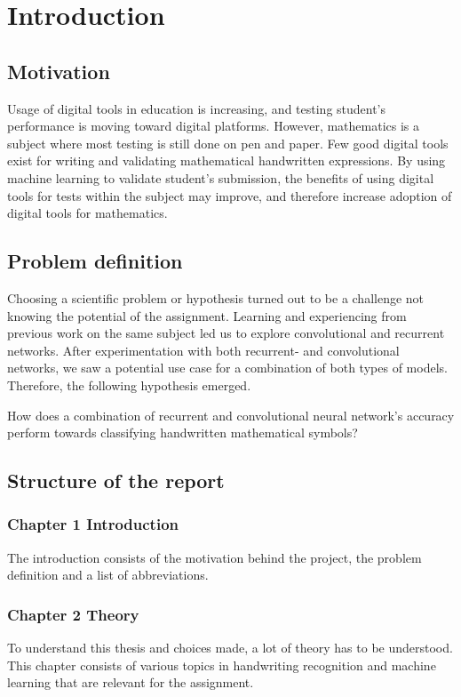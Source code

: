\chapter{Introduction}

\section{Motivation}

Usage of digital tools in education is increasing, and testing student's performance is moving toward digital platforms. However, mathematics is a subject where most testing is still done on pen and paper. Few good digital tools exist for writing and validating mathematical handwritten expressions. By using machine learning to validate student's submission, the benefits of using digital tools for tests within the subject may improve, and therefore increase adoption of digital tools for mathematics.

\section{Problem definition} 
\label{problem_definition}

Choosing a scientific problem or hypothesis turned out to be a challenge not knowing the potential of the assignment. Learning and experiencing from previous work on the same subject led us to explore convolutional and recurrent networks. After experimentation with both recurrent- and convolutional networks, we saw a potential use case for a combination of both types of models. Therefore, the following hypothesis emerged.

How does a combination of recurrent and convolutional neural network's accuracy perform towards classifying handwritten mathematical symbols?

\section{Structure of the report}
\subsection{Chapter 1 Introduction}
The introduction consists of the motivation behind the project, the problem definition and a list of abbreviations.

\subsection{Chapter 2 Theory}
To understand this thesis and choices made, a lot of theory has to be understood. This chapter consists of various topics in handwriting recognition and machine learning that are relevant for the assignment.

